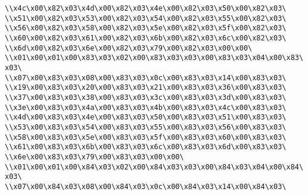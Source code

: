 \verb|\\x4c\x00\x82\x03\x4d\x00\x82\x03\x4e\x00\x82\x03\x50\x00\x82\x03\|\newline
\verb|\\x51\x00\x82\x03\x53\x00\x82\x03\x54\x00\x82\x03\x55\x00\x82\x03\|\newline
\verb|\\x56\x00\x82\x03\x58\x00\x82\x03\x5e\x00\x82\x03\x5f\x00\x82\x03\|\newline
\verb|\\x60\x00\x82\x03\x61\x00\x82\x03\x6b\x00\x82\x03\x6c\x00\x82\x03\|\newline
\verb|\\x6d\x00\x82\x03\x6e\x00\x82\x03\x79\x00\x82\x03\x00\x00\|\newline
\verb|\\x01\x00\x01\x00\x83\x03\x02\x00\x83\x03\x03\x00\x83\x03\x04\x00\x83\x03\|\newline
\verb|\\x07\x00\x83\x03\x08\x00\x83\x03\x0c\x00\x83\x03\x14\x00\x83\x03\|\newline
\verb|\\x19\x00\x83\x03\x20\x00\x83\x03\x21\x00\x83\x03\x36\x00\x83\x03\|\newline
\verb|\\x37\x00\x83\x03\x38\x00\x83\x03\x3c\x00\x83\x03\x3d\x00\x83\x03\|\newline
\verb|\\x3e\x00\x83\x03\x4a\x00\x83\x03\x4b\x00\x83\x03\x4c\x00\x83\x03\|\newline
\verb|\\x4d\x00\x83\x03\x4e\x00\x83\x03\x50\x00\x83\x03\x51\x00\x83\x03\|\newline
\verb|\\x53\x00\x83\x03\x54\x00\x83\x03\x55\x00\x83\x03\x56\x00\x83\x03\|\newline
\verb|\\x58\x00\x83\x03\x5e\x00\x83\x03\x5f\x00\x83\x03\x60\x00\x83\x03\|\newline
\verb|\\x61\x00\x83\x03\x6b\x00\x83\x03\x6c\x00\x83\x03\x6d\x00\x83\x03\|\newline
\verb|\\x6e\x00\x83\x03\x79\x00\x83\x03\x00\x00\|\newline
\verb|\\x01\x00\x01\x00\x84\x03\x02\x00\x84\x03\x03\x00\x84\x03\x04\x00\x84\x03\|\newline
\verb|\\x07\x00\x84\x03\x08\x00\x84\x03\x0c\x00\x84\x03\x14\x00\x84\x03\|\newline

